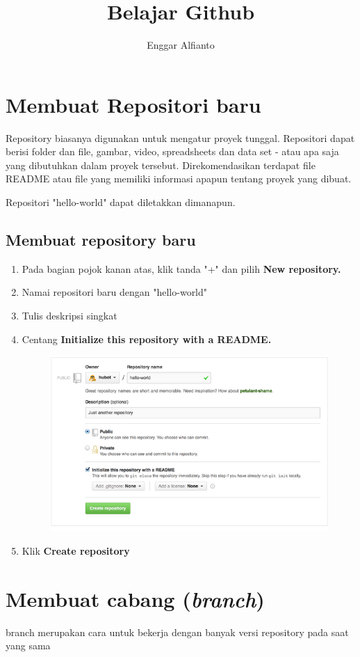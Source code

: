 \documentclass[12pt,a4paper]{article}
\author{Enggar Alfianto}
\title{Belajar Github}
\begin{document}
\maketitle
\section{Membuat Repositori baru}
Repository biasanya digunakan untuk mengatur proyek tunggal. Repositori dapat berisi folder dan file, gambar, video, spreadsheets dan data set - atau apa saja yang dibutuhkan dalam proyek tersebut. Direkomendasikan terdapat file README atau file yang memiliki informasi apapun tentang proyek yang dibuat. 

Repositori "hello-world" dapat diletakkan dimanapun.
\subsection*{Membuat repository baru}
\begin{enumerate}
\item Pada bagian pojok kanan atas, klik tanda "+" dan pilih \textbf{New repository.}
\item Namai repositori baru dengan "hello-world"
\item Tulis deskripsi singkat
\item Centang \textbf{Initialize this repository with a README.}
\begin{figure}[h!]
\includegraphics[scale=0.5]{image/create.png} 
\end{figure}
\item Klik \textbf{Create repository}
\end{enumerate}

\section{Membuat cabang (\textit{branch})}
branch merupakan cara untuk bekerja dengan banyak versi repository pada saat yang sama
\end{document}
